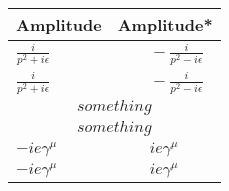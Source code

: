 \documentclass[11pt,a4paper]{article}
\begin{document}
\renewcommand{\arraystretch}{2.3}
\begin{longtable}{l:l}
	\textbf{Amplitude}                        & \textbf{Amplitude*}    \\ \hline
	$\displaystyle \frac{i}{p^2 + i\epsilon}$ &
	$\qquad \displaystyle -\frac{i}{p^2 - i\epsilon}$                  \\
	$\displaystyle \frac{i}{p^2 + i\epsilon}$ &
	$\qquad \displaystyle -\frac{i}{p^2 - i\epsilon}$                  \\
	                                    \\
	                                    \\
	$-ie \gamma^\mu$                          & $\qquad ie \gamma^\mu$ \\
	$-ie \gamma^\mu$                          & $\qquad ie \gamma^\mu$ \\
\end{longtable}
\end{document}
